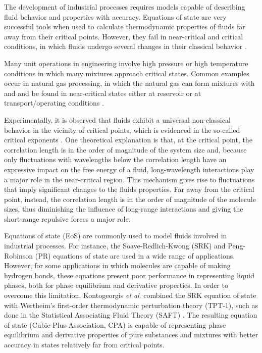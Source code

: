 \documentclass[preprint,12pt,3p]{elsarticle}
\begin{document}
The development of industrial processes requires models capable of describing fluid behavior and properties with accuracy.
Equations of state are very successful tools when used to calculate thermodynamic properties of fluids far away from their critical points.
However, they fail in near-critical and critical conditions, in which fluids undergo several changes in their classical behavior \cite{sengers1986thermodynamic}.

Many unit operations in engineering involve high pressure or high temperature conditions in which many mixtures approach critical states.
Common examples occur in natural gas processing, in which the natural gas can form mixtures with  and  and be found in near-critical states either at reservoir or at transport/operating conditions  \citep{kermani2003carbon}.

Experimentally, it is observed that fluids exhibit a universal non-classical behavior in the vicinity of critical points, which is evidenced in the so-called critical exponents \citep{carles2010brief}.
One theoretical explanation is that, at the critical point, the correlation length is in the order of magnitude of the system size and, because only fluctuations with wavelengths below the correlation length have an expressive impact on the free energy of a fluid, long-wavelength interactions play a major role in the near-critical region.
This mechanism gives rise to fluctuations that imply significant changes to the fluids properties.
Far away from the critical point, instead, the correlation length is in the order of magnitude of the molecule sizes, thus diminishing the influence of long-range interactions and giving the short-range repulsive forces a major role.

Equations of state (EoS) are commonly used to model fluids involved in industrial processes.
For instance, the Soave-Redlich-Kwong (SRK) \cite{soave1972equilibrium} and Peng-Robinson (PR) \cite{peng1976new} equations of state are used in a wide range of applications.
However, for some applications in which molecules are capable of making hydrogen bonds, these equations present poor performance in representing liquid phases, both for phase equilibrium and derivative properties.
In order to overcome this limitation, Kontogeorgis \textit{et al}. \cite{kontogeorgis1996equation} combined the SRK equation of state with Wertheim's first-order thermodynamic perturbation theory (TPT-1), such as done in the Statistical Associating Fluid Theory (SAFT) \citep{chapman1990new}.
The resulting equation of state (Cubic-Plus-Association, CPA) is capable of representing phase equilibrium and derivative properties of pure substances and mixtures with better accuracy in states relatively far from critical points.
\end{document}

